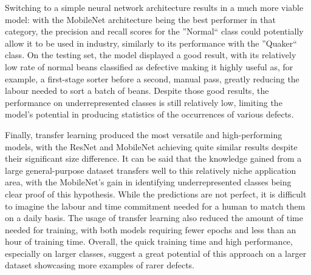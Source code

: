 Switching to a simple neural network architecture results in a much more viable model: with the MobileNet architecture
being the best performer in that category, the precision and recall scores for the ''Normal`` class could potentially allow it
to be used in industry, similarly to its performance with the ''Quaker`` class.
On the testing set, the model displayed a good result, with its relatively low rate of normal beans classified as defective
making it highly useful as, for example, a first-stage sorter before a second, manual pass, greatly reducing the labour
needed to sort a batch of beans.
Despite those good results, the performance on underrepresented classes is still relatively low, limiting the model's
potential in producing statistics of the occurrences of various defects.

Finally, transfer learning produced the most versatile and high-performing models, with the ResNet and MobileNet achieving
quite similar results despite their significant size difference.
It can be said that the knowledge gained from a large general-purpose dataset transfers well to this relatively niche
application area, with the MobileNet's gain in identifying underrepresented classes being clear proof of this hypothesis.
While the predictions are not perfect, it is difficult to imagine the labour and time commitment needed for a human to match
them on a daily basis.
The usage of transfer learning also reduced the amount of time needed for training, with both models requiring fewer epochs and less than an hour of training time.
Overall, the quick training time and high performance, especially on larger classes, suggest a great potential of this approach
on a larger dataset showcasing more examples of rarer defects.

